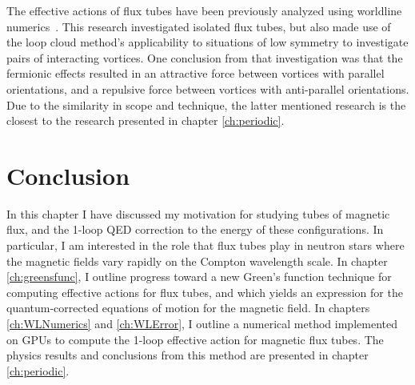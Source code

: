 The effective actions of flux tubes have been previously analyzed using worldline 
numerics~\cite{Langfeld:2002vy}.  This research investigated isolated 
flux tubes, but also made use of the loop cloud method's applicability to situations 
of low symmetry to investigate pairs of interacting 
vortices. One conclusion from that investigation was that the fermionic effects resulted 
in an attractive force between vortices with parallel orientations, and a repulsive 
force between vortices with anti-parallel orientations.
Due to the similarity in scope and technique, the latter mentioned 
research is the closest to the research presented in chapter \ref{ch:periodic}.



\section{Conclusion}

In this chapter I have discussed my motivation for studying tubes of magnetic 
flux, and the 1-loop \ac{QED} correction to the energy of these configurations. 
In particular, I am interested in the role that flux tubes play in neutron stars 
where the magnetic fields vary rapidly on the Compton wavelength scale. 
In chapter \ref{ch:greensfunc}, I outline progress toward a new Green's 
function technique for computing effective actions for flux tubes, and which 
yields an expression for the quantum-corrected equations of motion for the 
magnetic field. In chapters \ref{ch:WLNumerics} and \ref{ch:WLError}, I outline 
a numerical method implemented on \acp{GPU} to compute the 1-loop effective action 
for magnetic flux tubes. The physics results and conclusions from this method 
are presented in chapter \ref{ch:periodic}.

